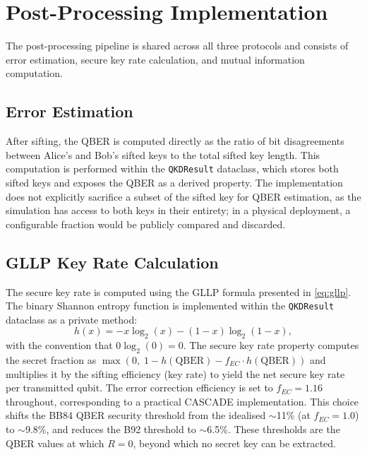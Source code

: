 \documentclass[10pt, a4paper]{report}
\begin{document}
\section{Post-Processing Implementation}

The post-processing pipeline is shared across all three protocols and consists of error estimation, secure key rate calculation, and mutual information computation.

\subsection{Error Estimation}

After sifting, the QBER is computed directly as the ratio of bit disagreements between Alice's and Bob's sifted keys to the total sifted key length. This computation is performed within the \texttt{QKDResult} dataclass, which stores both sifted keys and exposes the QBER as a derived property. The implementation does not explicitly sacrifice a subset of the sifted key for QBER estimation, as the simulation has access to both keys in their entirety; in a physical deployment, a configurable fraction would be publicly compared and discarded.

\subsection{GLLP Key Rate Calculation}

The secure key rate is computed using the GLLP formula presented in \cref{eq:gllp}. The binary Shannon entropy function is implemented within the \texttt{QKDResult} dataclass as a private method:
%
\begin{equation}
\label{eq:binary-entropy}
h(x) = -x \log_2(x) - (1 - x) \log_2(1 - x),
\end{equation}
%
with the convention that $0 \log_2(0) = 0$. The secure key rate property computes the secret fraction as $\max(0,\; 1 - h(\text{QBER}) - f_{EC} \cdot h(\text{QBER}))$ and multiplies it by the sifting efficiency (key rate) to yield the net secure key rate per transmitted qubit. The error correction efficiency is set to $f_{EC} = 1.16$ throughout, corresponding to a practical CASCADE implementation. This choice shifts the BB84 QBER security threshold from the idealised $\sim$11\% (at $f_{EC} = 1.0$) to $\sim$9.8\%, and reduces the B92 threshold to $\sim$6.5\%. These thresholds are the QBER values at which $R = 0$, beyond which no secret key can be extracted.
\end{document}
